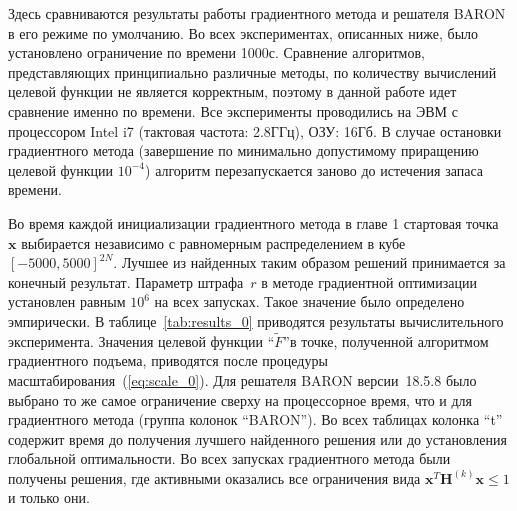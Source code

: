 Здесь сравниваются результаты работы градиентного метода и решателя BARON в его режиме по умолчанию. Во всех экспериментах, описанных ниже, было установлено ограничение по времени 1000с. Сравнение алгоритмов, представляющих принципиально различные методы, по количеству вычислений целевой функции не является корректным, поэтому в данной работе идет сравнение именно по времени. Все эксперименты проводились на ЭВМ с процессором Intel i7 (тактовая частота: 2.8ГГц), ОЗУ: 16Гб. В случае остановки градиентного метода (завершение по минимально допустимому приращению целевой функции $10^{-4}$) алгоритм перезапускается заново до истечения запаса времени.

Во время каждой инициализации градиентного метода в главе 1 стартовая точка~$\textbf{x}$ выбирается независимо с равномерным распределением в кубе $[-5000, 5000]^{2N}$. Лучшее из найденных таким образом решений принимается за конечный результат. Параметр штрафа~$r$ в методе градиентной оптимизации установлен равным $10^6$ на всех запусках. Такое значение было определено эмпирически. В таблице~\ref{tab:results_0} приводятся результаты вычислительного эксперимента. Значения целевой функции ``$\tilde{F}$''в точке, полученной алгоритмом градиентного подъема, приводятся после процедуры масштабирования~(\ref{eq:scale_0}). Для решателя BARON версии~18.5.8 было выбрано то же самое ограничение сверху на процессорное время, что и для градиентного метода (группа колонок ``BARON''). Во всех таблицах колонка ``t'' содержит время до получения лучшего найденного решения или до установления глобальной оптимальности. Во всех запусках градиентного метода были получены решения, где активными оказались все ограничения вида $\textbf{x}^{T}\textbf{H}^{(k)}\textbf{x} \leq 1$ и только они.


